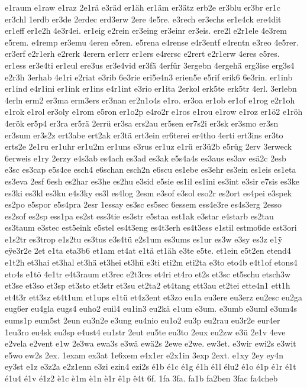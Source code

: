 {e1raum
e1raw
e1raz
2e1rä
e3räd
er1äh
er1äm
er3ätz
erb2e
er3blu
er3br
er1c
er3chl
1erdb
er3de
2erdec
erd3erw
2ere
4e5re.
e3rech
er3echs
er1e4ck
ere4dit
er1eff
er1e2h
4e3r4ei.
er1eig
e2rein
er3eing
er3einr
er3eis.
ere2l
e2r1ele
4e3rem
e5rem.
e4remp
er3emu
4eren
e5ren.
e5rena
e4rense
e4r3entf
e4rentn
e3reo
4e5rer.
er3erf
e2r1erh
e2rerk
4erern
er1err
er1ers
e4rersc
e2rert
e2r1erw
4eres
e5res.
er1ess
er3e4ti
er1eul
ere3us
er3e4vid
er3fä
4erfür
3ergebn
4ergehä
erg3ise
erg3s4
e2r3h
3erhab
4e1ri
e2riat
e3rib
6e3rie
eri5e4n3
erien5e
e5rif
erik6
6e3rin.
er1inb
er1ind
e4r1ini
er1ink
er1ins
e4r1int
e3rio
er1ita
2erkol
erk5te
erk5tr
4erl.
3erlebn
4erln
erm2
er3ma
erm3ers
er3nan
er2n1o4s
e1ro.
er3oa
er1ob
er1of
e1rog
e2r1oh
e1rok
e1rol
er3oly
e1rom
e5ron
er1o2p
e4ro2r
e1ros
e1rou
e1row
e1roz
er1ö2
e1röh
4erök
er5p4
er3ra
er5rä
2errü
er3sa
ers2au
er5sen
er7s2i
er3sk
er3smo
er3sn
er3sum
er3s2z
ert3abe
ert2ak
er3tä
ert3ein
er6terei
er4tho
4erti
ert3ins
er3to
erts2e
2e1ru
er1uhr
er1u2m
er1uns
e3rus
er1uz
e1rü
er3ü2b
e5rüg
2erv
3erweck
6erweis
e1ry
2erzy
e4s3ab
es4ach
es3ad
es3ak
e5s4a4s
es3aus
es3av
esä2c
2esb
e3sc
es3cap
e5s4ce
esch4
e6schan
esch2n
e6scu
es1ebe
es3ehr
es3ein
es1eis
es1eta
es3eva
2esf
6esh
es2har
es3he
es2hu
e3sid
e5sie
es1il
es1ini
es3int
e3sir
e7sis
es3ke
es3ki
es3kl
es3ku
e4s3ky
es3l
es4log
2esm
e3sof
e3sol
eso2r
es2ort
es4pei
e3spek
es2po
e5spor
e5s4pra
2esr
1essay
es3sc
es5sec
6essem
ess4e3re
es4s3erg
2esso
es2sof
es2sp
ess1pa
es2st
ess3tie
es3str
e5staa
est1ak
e3star
e4starb
es2tau
es3taum
e3stec
est5eink
e5stel
es4t3eng
es4t3erh
es4t3ess
e1stil
estmo6de
est3ori
e1s2tr
es3trop
e1s2tu
es3tus
e3s4tü
e2s1um
es3ums
es1ur
es3w
e3sy
es3z
e1^^ff
e^^ffe3r2e
2et
e1ta
eta3b6
et1am
et4at
e1tä
et1äh
e3te
e5te.
et1ein
e5t2en
etend4
e1t2h
et3hai
et3hal
et3hä
et3hei
et3hü
e3ti
eti2m
eti2ta
e3to
eto4b
e4t1of
etons4
eto4s
e1tö
4e1tr
e4t3raum
et3rec
e2t3res
et4ri
et4ro
et2s
et3sc
et5schu
etsch3w
et3se
et3so
et3sp
et3sto
et3str
et3su
et2ta2
et4tang
ett3au
et2tei
ette4n1
ett1h
et4t3r
ett3sz
et4t1um
et1ups
e1tü
et4z3ent
et3zo
eu1a
eu3ere
eu3erz
eu2esc
eu2ga
eug6er
eu4gla
eugs4
euho2
euil4
eu1in3
eu2kä
e1um
e3um.
e3umb
e3uml
e3um4s
eums1p
eum5st
2eun
eu3n2e
e3ung
eu4nio
eu1o2
eu3p
eu2rau
eu3r2e
eur4er
1eu3ro
eu4sk
eu3sp
e4ust4
eu1str
2eut
eu5te
eu3to
2eux
eu2zw
e3ü
2e1v
4eve
e2vela
e2vent
e1w
2e3wa
ewa3s
e3wä
ewä2s
2ewe
e2we.
ew3et.
e3wir
ewi2s
e3wit
e5wo
ew2s
2ex.
1exam
ex3at
1e6xem
e4x1er
e2x1in
3exp
2ext.
e1xy
2ey
ey4n
ey3st
e1z
e3z2a
e2z1enn
e3zi
ezin4
ezi2s
é1b
é1c
é1g
é1h
é1l
élu2
é1o
é1p
é1r
é1t
é1u4
é1v
é1z2
è1c
è1m
è1n
è1r
ê1p
ê4t
6f.
1fa
3fa.
fa1b
fa2ben
3fac
fa4cheb
}
